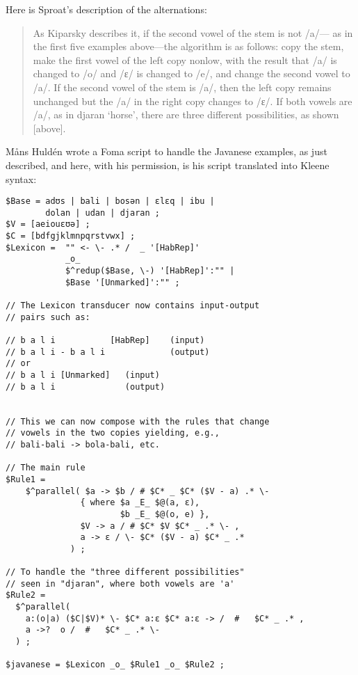 \vspace{0.5cm}

\noindent
Here is Sproat's description of the alternations:

\begin{quote}
As Kiparsky describes it, if the second vowel of the stem is not /a/---
 as in the first five examples above---the algorithm is as follows: 
 copy the stem, make the first vowel of the left copy nonlow, with the 
 result that /a/ is changed to /o/ and /ɛ/ is changed to /e/, and change 
 the second vowel to /a/. If the second vowel of the stem is /a/, then the 
 left copy remains unchanged but the /a/ in the right copy changes to /ɛ/. 
 If both vowels are /a/, as in djaran `horse', there are three different 
 possibilities, as shown [above].
\end{quote}

M\r{a}ns Huldén wrote a Foma script to handle the Javanese examples, as
just described, and here, with his permission, is his script translated into Kleene syntax:

\begin{Verbatim}
$Base = adʊs | bali | bosən | ɛlɛq | ibu | 
        dolan | udan | djaran ;
$V = [aeiouɛʊə] ;
$C = [bdfgjklmnpqrstvwx] ;
$Lexicon =  "" <- \- .* /  _ '[HabRep]'
            _o_
            $^redup($Base, \-) '[HabRep]':"" | 
			$Base '[Unmarked]':"" ;

// The Lexicon transducer now contains input-output
// pairs such as:

// b a l i           [HabRep]    (input)     
// b a l i - b a l i             (output)         
// or
// b a l i [Unmarked]   (input)
// b a l i              (output)


// This we can now compose with the rules that change
// vowels in the two copies yielding, e.g., 
// bali-bali -> bola-bali, etc.

// The main rule
$Rule1 =  
    $^parallel( $a -> $b / # $C* _ $C* ($V - a) .* \-
               { where $a _E_ $@(a, ɛ), 
                       $b _E_ $@(o, e) },
               $V -> a / # $C* $V $C* _ .* \- ,
               a -> ɛ / \- $C* ($V - a) $C* _ .*
             ) ;

// To handle the "three different possibilities" 
// seen in "djaran", where both vowels are 'a'
$Rule2 =  
  $^parallel(
    a:(o|a) ($C|$V)* \- $C* a:ɛ $C* a:ɛ -> /  #   $C* _ .* ,
    a ->?  o /  #   $C* _ .* \-
  ) ;

$javanese = $Lexicon _o_ $Rule1 _o_ $Rule2 ;
\end{Verbatim}


